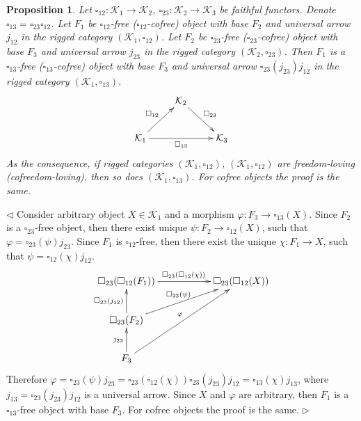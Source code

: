\documentclass[12pt]{article}
\newtheorem{proposition}[theorem]{Proposition}
\newenvironment{proof}{\par $\triangleleft$}{$\triangleright$}
\begin{document}
\begin{proposition}\label{PrCompOfFrIsFr} 
Let $\square_{12}:\mathcal{K}_1\to\mathcal{K}_2$, 
$\square_{23}:\mathcal{K}_2\to\mathcal{K}_3$ be faithful functors. 
Denote $\square_{13}=\square_{23}\square_{12}$. Let 
$F_1$ be $\square_{12}$-free ($\square_{12}$-cofree) object with base $F_2$ 
and universal arrow $j_{12}$ in the rigged 
category $(\mathcal{K}_1,\square_{12})$. Let $F_2$ be $\square_{23}$-free 
($\square_{23}$-cofree) object with base $F_3$ and universal arrow $j_{23}$ 
in the rigged category $(\mathcal{K}_2,\square_{23})$. Then $F_1$ is 
a $\square_{13}$-free ($\square_{13}$-cofree) 
object with base $F_3$ and universal arrow $\square_{23}(j_{23})j_{12}$ in 
the rigged category $(\mathcal{K}_1,\square_{13})$. 
$$
\xymatrix{& { \mathcal{K}_2} \ar[dr]^{\square_{23}} & \\  %
{\mathcal{K}_1} \ar[ur]^{\square_{12}} \ar[rr]_{\square_{13}} & &  %
{\mathcal{K}_3}}
$$
As the consequence, if rigged categories $(\mathcal{K}_1,\square_{12})$, 
$(\mathcal{K}_1,\square_{12})$ are freedom-loving (cofreedom-loving), then so 
does $(\mathcal{K}_1,\square_{13})$. For cofree objects the proof is the same.
\end{proposition}
\begin{proof}
Consider arbitrary object $X\in\mathcal{K}_1$ and a morphism 
$\varphi:F_3\to \square_{13}(X)$. Since $F_2$ is a $\square_{23}$-free object, 
then there exist unique $\psi:F_2\to \square_{12}(X)$, 
such that $\varphi=\square_{23}(\psi)j_{23}$. Since $F_1$ is 
$\square_{12}$-free, then there exist the unique $\chi:F_1\to X$, 
such that $\psi=\square_{12}(\chi)j_{12}$.
$$
\xymatrix
{{\square_{23}(\square_{12}(F_1))}
\ar[rr]^{\square_{23}(\square_{12}(\chi))}&  %
&{\square_{23}(\square_{12}(X))}\\
{\square_{23}(F_2)} \ar[u]^{\square_{23}(j_{12})}  %
\ar[urr]^{\square_{23}(\psi)}  %
& &\\
{F_3} \ar[u]^{j_{23}} \ar[uurr]^{\varphi} & \\  %
} 
$$
Therefore 
$\varphi
=\square_{23}(\psi)j_{23}
=\square_{23}(\square_{12}(\chi))\square_{23}(j_{23})j_{12}
=\square_{13}(\chi) j_{13}$, where $j_{13}=\square_{23}(j_{23})j_{12}$ 
is a universal arrow. Since $X$ and $\varphi$ are arbitrary, then 
$F_1$ is a $\square_{13}$-free object with base $F_3$. For cofree objects 
the proof is the same.
\end{proof}
\end{document}
